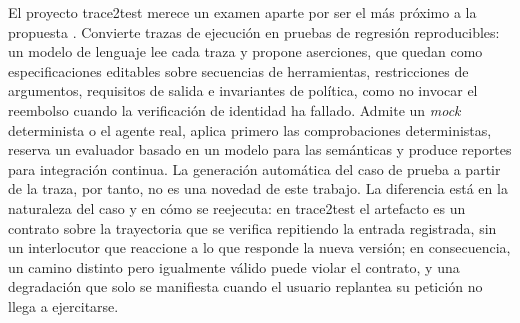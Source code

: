 El proyecto trace2test merece un examen aparte por ser el más próximo a la propuesta \cite{trace2test}. Convierte trazas de ejecución en pruebas de regresión reproducibles: un modelo de lenguaje lee cada traza y propone aserciones, que quedan como especificaciones editables sobre secuencias de herramientas, restricciones de argumentos, requisitos de salida e invariantes de política, como no invocar el reembolso cuando la verificación de identidad ha fallado. Admite un \textit{mock} determinista o el agente real, aplica primero las comprobaciones deterministas, reserva un evaluador basado en un modelo para las semánticas y produce reportes para integración continua. La generación automática del caso de prueba a partir de la traza, por tanto, no es una novedad de este trabajo. La diferencia está en la naturaleza del caso y en cómo se reejecuta: en trace2test el artefacto es un contrato sobre la trayectoria que se verifica repitiendo la entrada registrada, sin un interlocutor que reaccione a lo que responde la nueva versión; en consecuencia, un camino distinto pero igualmente válido puede violar el contrato, y una degradación que solo se manifiesta cuando el usuario replantea su petición no llega a ejercitarse.
\par

